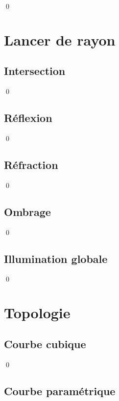 \documentclass[12pt]{article}
\newcommand{\state}{\noindent}
\begin{document}
\state

\qed

\pagebreak

\section{Lancer de rayon}

\subsection{Intersection}

\state

\qed

\subsection{Réflexion}

\state

\qed

\subsection{Réfraction}

\state

\qed

\subsection{Ombrage}

\state

\qed

\subsection{Illumination globale}

\state

\qed

\pagebreak

\section{Topologie}

\subsection{Courbe cubique}

\state

\qed

\subsection{Courbe paramétrique}
\end{document}

